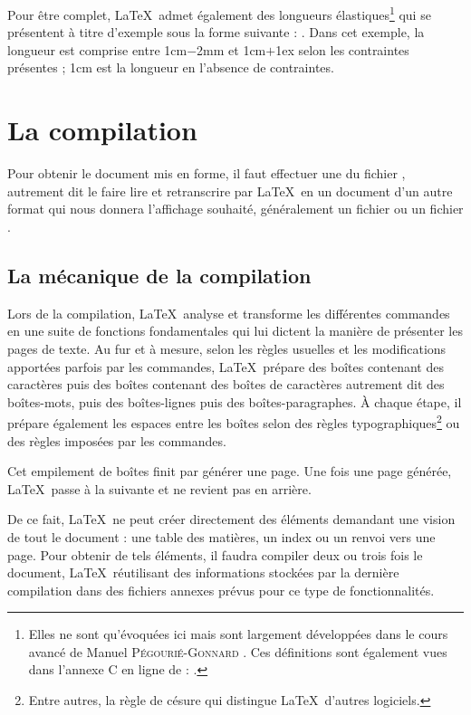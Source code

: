 Pour être complet, \LaTeX\ admet également des longueurs élastiques\footnote{Elles ne sont qu'évoquées ici mais sont largement développées dans le cours avancé de Manuel \textsc{Pégourié-Gonnard} \cite{pego}. Ces définitions sont également vues dans l'annexe C en ligne de \cite{bito} : .} qui se présentent à titre d'exemple sous la forme suivante : . Dans cet exemple, la longueur est comprise entre 1cm$-$2mm et 1cm$+$1ex selon les contraintes présentes ; 1cm est la longueur en l'absence de contraintes.

\section{La compilation}\label{compilation}  

Pour obtenir le document mis en forme, il faut effectuer une  du fichier , autrement dit le faire lire et retranscrire par \LaTeX\ en un document d'un autre format qui nous donnera l'affichage souhaité, généralement un fichier  ou un fichier . 


\subsection{La mécanique de la compilation}

Lors de la compilation, \LaTeX\ analyse et transforme les différentes commandes en une suite de fonctions fondamentales qui lui dictent la manière de présenter les pages de texte. Au fur et à mesure, selon les règles usuelles et les modifications apportées parfois par les commandes, \LaTeX\ prépare des boîtes contenant des caractères puis des boîtes contenant des boîtes de caractères autrement dit des boîtes-mots, puis des boîtes-lignes puis des boîtes-paragraphes. \`A chaque étape, il prépare également les espaces entre les boîtes selon des règles typographiques\footnote{Entre autres, la règle de césure qui distingue \LaTeX\ d'autres logiciels.} ou des règles imposées par les commandes. 

Cet empilement de boîtes finit par générer une page. Une fois une page générée, \LaTeX\ passe à la suivante et ne revient pas en arrière.

De ce fait, \LaTeX\ ne peut créer directement des éléments demandant une vision de tout le document : une table des matières, un index ou un renvoi vers une page. Pour obtenir de tels éléments, il faudra compiler deux ou trois fois le document, \LaTeX\ réutilisant des informations stockées par la dernière compilation dans des fichiers annexes prévus pour ce type de fonctionnalités.


